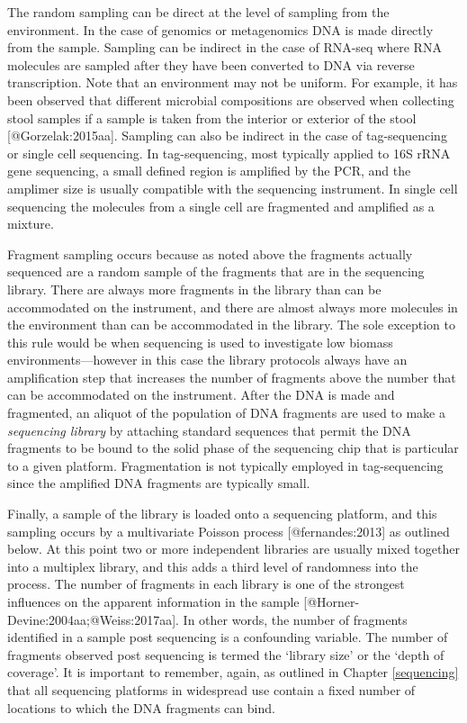\documentclass[
  onecolumn]{article}
\begin{document}
The random sampling can be direct at the level of sampling from the environment. In the case of genomics or metagenomics DNA is made directly from the sample. Sampling can be indirect in the case of RNA-seq where RNA molecules are sampled after they have been converted to DNA via reverse transcription. Note that an environment may not be uniform. For example, it has been observed that different microbial compositions are observed when collecting stool samples if a sample is taken from the interior or exterior of the stool {[}@Gorzelak:2015aa{]}. Sampling can also be indirect in the case of tag-sequencing or single cell sequencing. In tag-sequencing, most typically applied to 16S rRNA gene sequencing, a small defined region is amplified by the PCR, and the amplimer size is usually compatible with the sequencing instrument. In single cell sequencing the molecules from a single cell are fragmented and amplified as a mixture.

Fragment sampling occurs because as noted above the fragments actually sequenced are a random sample of the fragments that are in the sequencing library. There are always more fragments in the library than can be accommodated on the instrument, and there are almost always more molecules in the environment than can be accommodated in the library. The sole exception to this rule would be when sequencing is used to investigate low biomass environments---however in this case the library protocols always have an amplification step that increases the number of fragments above the number that can be accommodated on the instrument. After the DNA is made and fragmented, an aliquot of the population of DNA fragments are used to make a \emph{sequencing library} by attaching standard sequences that permit the DNA fragments to be bound to the solid phase of the sequencing chip that is particular to a given platform. Fragmentation is not typically employed in tag-sequencing since the amplified DNA fragments are typically small.

Finally, a sample of the library is loaded onto a sequencing platform, and this sampling occurs by a multivariate Poisson process {[}@fernandes:2013{]} as outlined below. At this point two or more independent libraries are usually mixed together into a multiplex library, and this adds a third level of randomness into the process. The number of fragments in each library is one of the strongest influences on the apparent information in the sample {[}@Horner-Devine:2004aa;@Weiss:2017aa{]}. In other words, the number of fragments identified in a sample post sequencing is a confounding variable. The number of fragments observed post sequencing is termed the `library size' or the `depth of coverage'. It is important to remember, again, as outlined in Chapter \ref{sequencing} that all sequencing platforms in widespread use contain a fixed number of locations to which the DNA fragments can bind.
\end{document}
